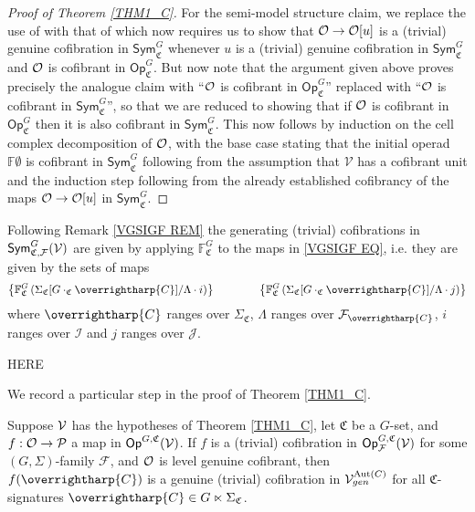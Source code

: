 \documentclass[a4paper,10pt
,draft
]{article}%
\renewcommand{\F}{\mathcal F}
\renewcommand{\1}{\eta}%
\newcommand{\vect}[1]{\text{\overrightharp{\ensuremath{#1}}}}
\begin{document}
\begin{proof}[Proof of Theorem \ref{THM1_C}]
For the semi-model structure claim, 
we replace the use of \cite[Thm. 11.3.2]{Hir03} with that of 
\cite[Thm. 2.2.2]{WY18}
which now requires us to show that 
$\mathcal{O} \to \mathcal{O}[u]$
is a (trivial) genuine cofibration in $\mathsf{Sym}^G_{\mathfrak{C}}$
whenever $u$ is a (trivial) genuine cofibration in $\mathsf{Sym}^G_{\mathfrak{C}}$
and $\mathcal{O}$ is cofibrant in $\mathsf{Op}^G_{\mathfrak{C}}$.
But now note that the argument given above proves precisely the analogue claim with 
``$\mathcal{O}$ is cofibrant in $\mathsf{Op}^G_{\mathfrak{C}}$''
replaced with 
``$\mathcal{O}$ is cofibrant in $\mathsf{Sym}^G_{\mathfrak{C}}$'',
so that we are reduced to showing that if 
$\mathcal{O}$ is cofibrant in $\mathsf{Op}^G_{\mathfrak{C}}$
then it is also cofibrant in $\mathsf{Sym}^G_{\mathfrak{C}}$.
This now follows by induction on the cell complex decomposition of $\mathcal{O}$,
with the base case stating that the initial operad $\mathbb{F}\emptyset$ is cofibrant in $\mathsf{Sym}^G_{\mathfrak{C}}$
following from the assumption that $\mathcal{V}$ has a cofibrant unit
and the induction step following from the already established cofibrancy of the maps $\mathcal{O} \to \mathcal{O}[u]$ in $\mathsf{Sym}^G_{\mathfrak{C}}$.
\end{proof}



\begin{remark}
Following Remark \ref{VGSIGF REM}
the generating (trivial) cofibrations in
$\mathsf{Sym}^G_{\mathfrak{C},\F}(\V)$
are given by applying $\mathbb{F}^G_{\mathfrak{C}}$
to the maps in \eqref{VGSIGF EQ}, i.e. they are given by the sets of maps
\begin{equation}\label{FVGSIGF EQ}
	\left\{
	\mathbb{F}^G_{\mathfrak{C}}
	\left(\Sigma_{\mathfrak{C}}[G \cdot_{\mathfrak{C}} \vect{C}]/\Lambda \cdot i \right)
	\right\}
\qquad \qquad
	\left\{
	\mathbb{F}^G_{\mathfrak{C}}
	\left(\Sigma_{\mathfrak{C}}[G \cdot_{\mathfrak{C}} \vect{C}]/\Lambda \cdot j \right)
	\right\}
\end{equation}
where $\vect{C}$ ranges over $\Sigma_{\mathfrak{C}}$,
$\Lambda$ ranges over $\F_{\vect{C}}$,
$i$ ranges over $\mathcal{I}$ and
$j$ ranges over $\mathcal{J}$.
\end{remark}





{\color{red} HERE}







We record a particular step in the proof of Theorem \ref{THM1_C}.
\begin{corollary}
      \label{LGC_COR}
      Suppose $\mathcal V$ has the hypotheses of Theorem \ref{THM1_C},
      let $\mathfrak C$ be a $G$-set, and $f: \mathcal{O} \to \mathcal{P}$ a map in $\mathsf{Op}^{G,\mathfrak C}(\mathcal V)$.
      If $f$ is a (trivial) cofibration in $\Op^{G, \mathfrak C}_\F(\V)$ for some $(G, \Sigma)$-family $\F$,
      and $\mathcal{O}$ is level genuine cofibrant, then
      $f(\vect C)$ is a genuine (trivial) cofibration in $\mathcal V^{\operatorname{Aut}(C)}_{gen}$ for all $\mathfrak C$-signatures $\vect C \in G \ltimes \Sigma_{\mathfrak C}$.
\end{corollary}
\end{document}
